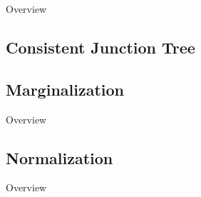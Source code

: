 \documentclass[10pt,usenames,dvipsnames]{beamer}
\begin{document}
\begin{frame}{Overview}
  \begin{figure}
    \vspace{0.6cm} %
  \end{figure}
\end{frame}



\subsection{Consistent Junction Tree}

\subsection{Marginalization}

\begin{frame}{Overview}
  \begin{figure}
    \vspace{0.6cm} %
  \end{figure}
\end{frame}



\subsection{Normalization}

\begin{frame}{Overview}
  \begin{figure}
    \vspace{0.6cm} %
  \end{figure}
\end{frame}
\end{document}
